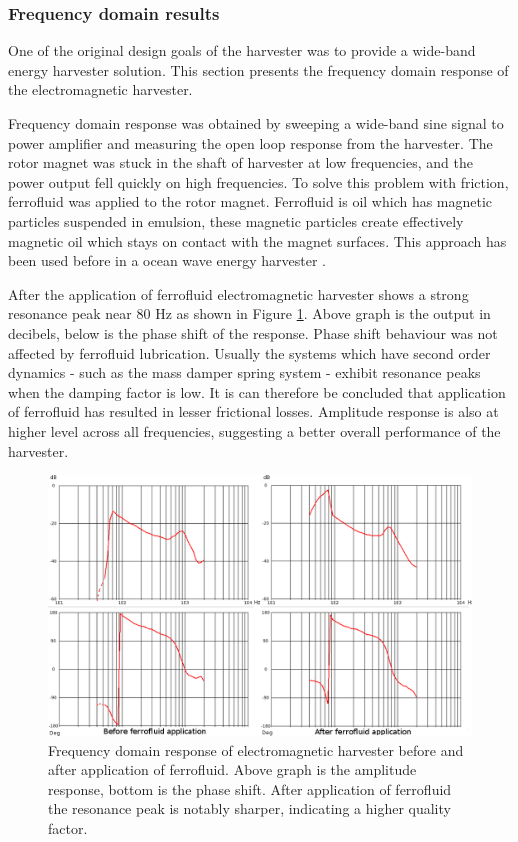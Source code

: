 \subsubsection{Frequency domain results} \label{sect:emh_fd}
One of the original design goals of the harvester was to provide a wide-band energy harvester solution. This section presents the frequency domain response of the electromagnetic harvester.

Frequency domain response was obtained by sweeping a wide-band sine signal to power amplifier and measuring the open loop response from the harvester. The rotor magnet was stuck in the shaft of harvester at low frequencies, and the power output fell quickly on high frequencies. To solve this problem with friction, ferrofluid was applied to the rotor magnet. Ferrofluid is oil which has magnetic particles suspended in emulsion, these magnetic particles create effectively magnetic oil which stays on contact with the magnet surfaces. This approach has been used before in a ocean wave energy harvester \cite{Cheung2009}.

 After the application of ferrofluid electromagnetic harvester shows a strong resonance peak near 80 Hz as shown in Figure \ref{fig:inductive_fd_dry}. Above graph is the output in decibels, below is the phase shift of the response. Phase shift behaviour was not affected by ferrofluid lubrication. Usually the systems which have second order dynamics - such as the mass damper spring system - exhibit resonance peaks when the damping factor is low. It is can therefore be concluded that application of ferrofluid has resulted in lesser frictional losses. Amplitude response is also at higher level across all frequencies, suggesting a better overall performance of the harvester. 

\begin{figure}[htb]
\begin{center}
\includegraphics[width=\columnwidth]{images/own_measurement/generator_shaker/inductive_fd_combined.png}
\end{center}
\caption{\label{fig:inductive_fd_dry} Frequency domain response of electromagnetic harvester before and after application of ferrofluid. Above graph is the amplitude response, bottom is the phase shift. After application of ferrofluid the resonance peak is notably sharper, indicating a higher quality factor.  }
\end{figure}

